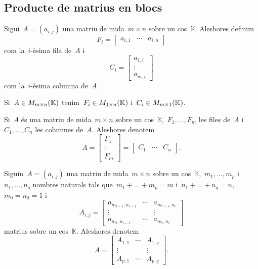 \documentclass[../../Main.tex]{subfiles}
\begin{document}
	\subsection{Producte de matrius en blocs}%
	\begin{definition}
		\label{def:fila d'una matriu}
		\label{def:columna d'una matriu}
		Sigui~\(A=(a_{i,j})\) una matriu de mida~\(m\times n\) sobre un cos~\(\mathbb{K}\).
		Aleshores definim
		\[F_{i}=\left[\begin{matrix}
		a_{i,1} & \cdots & a_{i,n}
		\end{matrix}\right]\]
		com la~\(i\)-èsima fila de~\(A\) i
		\[C_{i}=\left[\begin{matrix}
		a_{1,i} \\
		\vdots \\
		a_{m,i}
		\end{matrix}\right]\]
		com la~\(i\)-èsima columna de~\(A\).
	\end{definition}
	\begin{observation}
		\label{obs:on pertanyen les files i les columnes d'una matriu}
		Si~\(A\in M_{m\times n}(\mathbb{K})\) tenim~\(F_{i}\in M_{1\times n}(\mathbb{K})\) i~\(C_{i}\in M_{m\times 1}(\mathbb{K})\).
	\end{observation}
	\begin{notation}
		Si~\(A\) és una matriu de mida~\(m\times n\) sobre un cos~\(\mathbb{K}\),~\(F_{1},\dots,F_{m}\) les files de~\(A\) i~\(C_{1},\dots,C_{n}\) les columnes de~\(A\).
		Aleshores denotem
		\[A=\left[\begin{matrix}
		F_{1} \\
		\vdots \\
		F_{m}
		\end{matrix}\right]=\left[\begin{matrix}
		C_{1} & \cdots & C_{n}
		\end{matrix}\right].\]
	\end{notation}
	\begin{notation}
		Siguin~\(A=(a_{i,j})\) una matriu de mida~\(m\times n\) sobre un cos~\(\mathbb{K}\),~\(m_{1},\dots,m_{p}\) i~\(n_{1},\dots,n_{q}\) nombres naturals tals que~\(m_{1}+\dots+m_{p}=m\) i~\(n_{1}+\dots+n_{q}=n\),~\(m_{0}=n_{0}=1\) i
		\[A_{i,j}=\left[\begin{matrix}
		a_{m_{i-1},n_{i-1}} & \cdots & a_{m_{i-1},n_{i}}\\
		\vdots & & \vdots \\
		a_{m_{i},n_{i-1}} & \cdots & a_{m_{i},n_{i}}
		\end{matrix}\right]\]
		matrius sobre un cos~\(\mathbb{K}\).
		Aleshores denotem
		\[A=\left[\begin{matrix}
		A_{1,1} & \cdots & A_{1,q} \\
		\vdots & & \vdots \\
		A_{p,1} & \cdots & A_{p,q}
		\end{matrix}\right].\]
	\end{notation}
\end{document}
